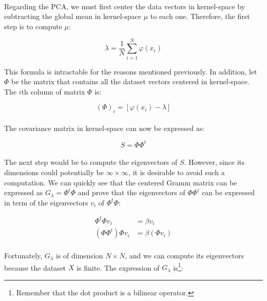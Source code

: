 \paragraph{}
Regarding the PCA, we must first center the data vectors in kernel-space by subtracting the global mean in kernel-space $\mu$ to each one.
Therefore, the first step is to compute $\mu$:

$$\lambda = \frac{1}{N}\sum_{i = 1}^{N} \varphi(x_i)$$

This formula is intractable for the reasons mentioned previously.  In addition,
let $\Phi$ be the matrix that contains all the dataset vectors centered in
kernel-space. The $i$th column of matrix $\Phi$ is:

$$(\Phi)_i = [\varphi(x_i) - \lambda]$$

\paragraph{} The covariance matrix in kernel-space can now be expressed as:

$$S = \Phi\Phi^t$$

\paragraph{} The next step would be to compute the eigenvectors of $S$.
However, since its dimensions could potentially be $\infty \times \infty$, it
is desirable to avoid such a computation. We can quickly see that the centered
Gramm matrix can be expressed as $G_\lambda = \Phi^t\Phi$ and prove that
the eigenvectors of $\Phi\Phi^t$ can be expressed in term of the eigenvectors
$v_i$ of $\Phi^t\Phi$:

\begin{align}\label{eq:grammcovar}
\Phi^t\Phi v_i &= \beta v_i \\
(\Phi\Phi^t)\Phi v_i &= \beta (\Phi v_i)
\end{align}

\paragraph{} Fortunately, $G_\lambda$ is of dimension $N \times N$, and we can
compute its eigenvectors because the dataset $X$ is finite. The expression of
$G_\lambda$ is\footnote{Remember that the dot product is a bilinear operator.}:


